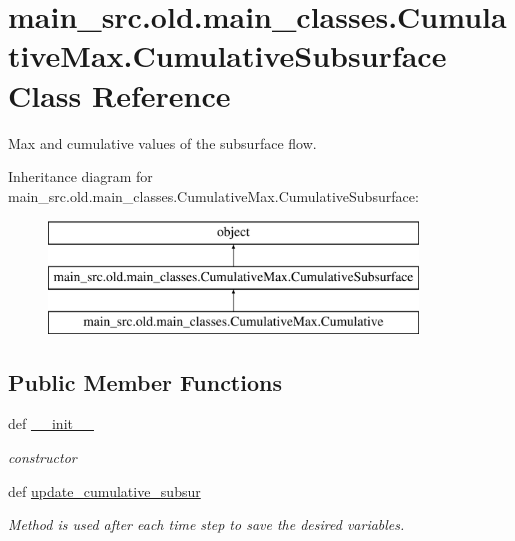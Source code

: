 \hypertarget{classmain__src_8old_1_1main__classes_1_1CumulativeMax_1_1CumulativeSubsurface}{\section{main\-\_\-src.\-old.\-main\-\_\-classes.\-Cumulative\-Max.\-Cumulative\-Subsurface Class Reference}
\label{classmain__src_8old_1_1main__classes_1_1CumulativeMax_1_1CumulativeSubsurface}
}


Max and cumulative values of the subsurface flow.  


Inheritance diagram for main\-\_\-src.\-old.\-main\-\_\-classes.\-Cumulative\-Max.\-Cumulative\-Subsurface\-:\begin{figure}[H]
\begin{center}
\leavevmode
\includegraphics[height=3.000000cm]{classmain__src_8old_1_1main__classes_1_1CumulativeMax_1_1CumulativeSubsurface}
\end{center}
\end{figure}
\subsection*{Public Member Functions}
\begin{DoxyCompactItemize}
\item 
\hypertarget{classmain__src_8old_1_1main__classes_1_1CumulativeMax_1_1CumulativeSubsurface_a965f01bebbf8fbf83fa9e625956d9d79}{def \hyperlink{classmain__src_8old_1_1main__classes_1_1CumulativeMax_1_1CumulativeSubsurface_a965f01bebbf8fbf83fa9e625956d9d79}{\-\_\-\-\_\-init\-\_\-\-\_\-}}\label{classmain__src_8old_1_1main__classes_1_1CumulativeMax_1_1CumulativeSubsurface_a965f01bebbf8fbf83fa9e625956d9d79}

\begin{DoxyCompactList}\small\item\em constructor \end{DoxyCompactList}\item 
def \hyperlink{classmain__src_8old_1_1main__classes_1_1CumulativeMax_1_1CumulativeSubsurface_a4a0519bcc7d03a5a463674d3e180efd2}{update\-\_\-cumulative\-\_\-subsur}
\begin{DoxyCompactList}\small\item\em Method is used after each time step to save the desired variables. \end{DoxyCompactList}\end{DoxyCompactItemize}
